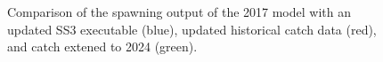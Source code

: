 \documentclass[
]{scrartcl}
\begin{document}
\section{}\label{section}

\begin{figure}


\caption{\label{fig-bridge3-comp2}Comparison of the spawning output of
the 2017 model with an updated SS3 executable (blue), updated historical
catch data (red), and catch extened to 2024 (green).}

\end{figure}%
\end{document}
